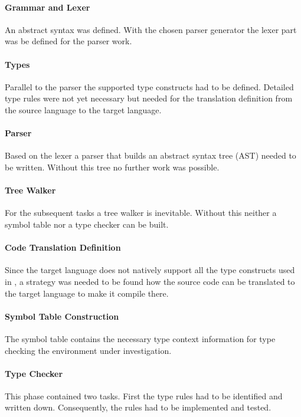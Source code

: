 \paragraph{Grammar and Lexer}
An abstract syntax was defined. With the chosen parser generator
the lexer part was be defined for the parser work.

\paragraph{Types}
Parallel to the parser the supported type constructs had to be
defined. Detailed type rules were not yet necessary but needed for the
translation definition from the source language to the target language.

\paragraph{Parser}
Based on the lexer a parser that builds an abstract syntax tree
(AST) needed to be written. Without this tree no further work was possible.

\paragraph{Tree Walker}
For the subsequent tasks a tree walker is inevitable. Without this
neither a symbol table nor a type checker can be built.

\paragraph{Code Translation Definition}
Since the target language does not natively support all the type
constructs used in \ooplss, a strategy was needed to be found
how the source code can be translated to the target language to make it
compile there.

\paragraph{Symbol Table Construction}
The symbol table contains the necessary type context information for
type checking the environment under investigation.

\paragraph{Type Checker}
This phase contained two tasks. First the type rules had to be identified
and written down. Consequently, the rules had to be implemented and tested.

